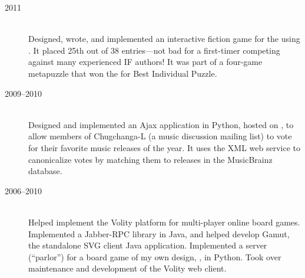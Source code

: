 \documentclass{article}
\begin{document}
\begin{description}
\item[2011]
{\large {}} \\
Designed, wrote, and implemented an interactive fiction game for the
 using
.  It placed 25th out of 38
entries---not bad for a first-timer competing against many experienced
IF authors!  It was part of a four-game metapuzzle that won the
 for
Best Individual Puzzle.
\end{description}

\begin{description}
\item[2009--2010]
{\large {}} \\
Designed and implemented an Ajax application in Python, hosted on
, to allow
members of Chugchanga-L (a music discussion mailing list) to vote for
their favorite music releases of the year.  It uses the
 XML web service to
canonicalize votes by matching them to releases in the MusicBrainz
database.
\end{description}

\begin{description}
\item[2006--2010]
{\large {}} \\
Helped implement the Volity platform for multi-player online board
games.  Implemented a Jabber-RPC library in Java, and helped develop
Gamut, the standalone SVG client Java application.  Implemented a
server (``parlor'') for a board game of my own design,
,
in Python.  Took over maintenance and development of the Volity web
client.
\end{description}
\end{document}
